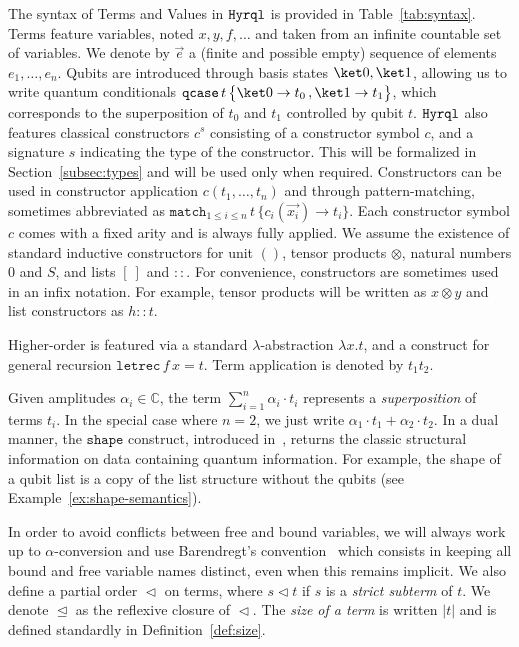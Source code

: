 \documentclass[10pt,a4paper]{article}
\newcommand{\nil}{[~]}
\newcommand{\textqcase}{\ensuremath{\mathtt{qcase}}}
\newcommand{\textmatch}{\ensuremath{\mathtt{match}}}
\newcommand{\textletrec}{\ensuremath{\mathtt{letrec}}}
\newcommand{\textshape}{\ensuremath{\mathtt{shape}}}
\newcommand{\zket}{\ket 0}
\newcommand{\oket}{\ket 1}
\newcommand{\qcasebase}[2]{
  \textqcase\,#1\left\{\! \begin{aligned} #2 \end{aligned}\right\}
}
\newcommand{\qcase}[3]{
  \qcasebase {#1} {\zket \to #2\,, \oket \to #3}
}
\newcommand{\qcasedefault}[1]{\ensuremath{\qcase{#1}{t_0}{t_1}}}
\newcommand{\matchdefaultcollapsedany}[2]{
  \textmatch_{1 \leq i \leq n}\,#1\,\{
    c_i(\overrightarrow{x_i}) \to #2_i
  \}
}
\newcommand{\matchdefaultcollapsed}[1]{\matchdefaultcollapsedany{#1}{t}}
\newcommand{\lbd}[2]{\lambda #1 .#2}
\newcommand{\letrec}[3]{\textletrec\,#1\,#2=#3}
\newcommand{\subterm}{\vartriangleleft}
\newcommand{\subtermeq}{\trianglelefteq}
\newcommand{\size}[1]{|#1|}
\newcommand{\hyrql}{{{\tt{Hyrql}}}}
\newcommand{\seq}[1]{\overrightarrow{#1}}
\begin{document}
The syntax of Terms and Values in $\hyrql$ is provided in
Table~\ref{tab:syntax}. Terms feature variables, noted $x, y, f, \dots$ and
taken from an infinite countable set of variables. We denote by $\seq{e}$ a
(finite and possible empty) sequence of elements $e_1, \dots, e_n$. Qubits are
introduced through basis states $\zket, \oket$, allowing us to write quantum
conditionals $\qcasedefault t$, which corresponds to the superposition of $t_0$
and $t_1$ controlled by qubit $t$. $\hyrql$ also features classical constructors
$c^s$ consisting of a constructor symbol $c$, and a signature $s$ indicating
the type of the constructor. This will be formalized in
Section~\ref{subsec:types} and will be used only when required.
Constructors can be used in constructor application $c(t_1, \dots, t_n)$
and through pattern-matching, sometimes abbreviated as $\matchdefaultcollapsed
t$. Each constructor symbol $c$ comes with a fixed arity and is always fully
applied. We assume the existence of standard inductive constructors for unit
$()$, tensor products $\otimes$, natural numbers $0$ and $S$, and lists $\nil$
and $::$. For convenience, constructors are sometimes used in an infix
notation. For example, tensor products will be written as $x \otimes y$ and
list constructors as $h::t$.

Higher-order is featured via a standard $\lambda$-abstraction $\lbd x t$, and a
construct for general recursion $\letrec f x t$. Term application is denoted by
$t_1t_2$.

Given amplitudes $\alpha_i \in \mathbb C$, the term $\sum_{i=1}^n \alpha_i
\cdot t_i$ represents a \emph{superposition} of terms $t_i$. In the special
case where $n=2$, we just write $\alpha_1 \cdot t_1+\alpha_2 \cdot t_2$. In a
dual manner, the $\textshape$ construct, introduced in~\cite{GLRSV13},
returns the classic structural information on data containing quantum
information. For example, the shape of a qubit list is a copy of the list
structure without the qubits (see Example~\ref{ex:shape-semantics}).


In order to avoid conflicts
between free and bound variables, we will always work up to $\alpha$-conversion
and use Barendregt's convention~\cite[p. 26]{Bar84} which consists in keeping
all bound and free variable names distinct, even when this remains implicit.
We also define a partial order $\subterm$ on terms, where $s \subterm t$ if $s$
is a \emph{strict subterm} of $t$. We denote $\subtermeq$ as the reflexive
closure of $\subterm$. The \emph{size of a term} is written $\size t$ and is
defined standardly in Definition~\ref{def:size}.
\end{document}
